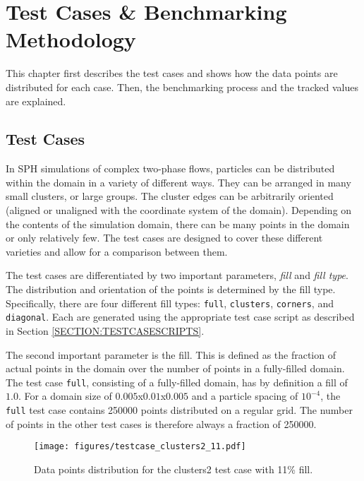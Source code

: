 
\chapter{Test Cases \& Benchmarking Methodology}
\label{CHAPTER:BENCHMARKING}

This chapter first describes the test cases and shows how the data points are distributed for each case. Then, the benchmarking process and the tracked values are explained.

\section{Test Cases}
\label{SECTION:TESTCASES}

In SPH simulations of complex two-phase flows, particles can be distributed within the domain in a variety of different ways. They can be arranged in many small clusters, or large groups. The cluster edges can be arbitrarily oriented (aligned or unaligned with the coordinate system of the domain). Depending on the contents of the simulation domain, there can be many points in the domain or only relatively few. The test cases are designed to cover these different varieties and allow for a comparison between them.

The test cases are differentiated by two important parameters, {\itshape fill} and {\itshape fill type}. The distribution and orientation of the points is determined by the fill type. Specifically, there are four different fill types: \texttt{full}, \texttt{clusters}, \texttt{corners}, and \texttt{diagonal}. Each are generated using the appropriate test case script as described in Section \ref{SECTION:TESTCASESCRIPTS}.

The second important parameter is the fill. This is defined as the fraction of actual points in the domain over the number of points in a fully-filled domain. The test case \texttt{full}, consisting of a fully-filled domain, has by definition a fill of $1.0$. For a domain size of $0.005$x$0.01$x$0.005$ and a particle spacing of $10^{-4}$, the \texttt{full} test case contains 250000 points distributed on a regular grid. The number of points in the other test cases is therefore always a fraction of 250000. 

\begin{figure}[h]
	\centering
	\texttt{[image: figures/testcase\_clusters2\_11.pdf]}
	\caption{Data points distribution for the clusters2 test case with 11\% fill.}
	\label{FIG:clusters2_11}
\end{figure}


